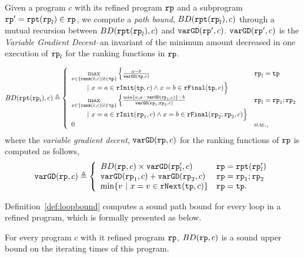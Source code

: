 \begin{defn}
\label{def:loopbound}
Given a program $c$ with its refined program $\mathtt{rp}$ and a subprogram $\mathtt{rp}' = \mathtt{rpt}(\mathtt{rp}_l) \in \mathtt{rp}$, we compute a \emph{path bound}, $BD(\mathtt{rpt}(\mathtt{rp}_l), c)$
through a mutual recursion between  $BD(\mathtt{rpt}(\mathtt{rp}_l), c)$ and $\mathtt{varGD}(\mathtt{rp}', c)$.
$\mathtt{varGD}(\mathtt{rp}', c)$ is the \emph{Variable Gradient Decent}--an invariant of the minimum amount decreased in one execution of $\mathtt{rp}_l$ for the ranking functions in $\mathtt{rp}$.

 \[
  BD(\rprepeat(\rprog_l), c)\triangleq
 \left\{ 
 \begin{array}{ll}
 \max\limits_{x \in \left\{ \rank(\absevent, c) | \absevent \in \tpath \right\}} 
 \Big\{ {\frac{a - b}{\varGD(\tpath, c)}} & \rprog_l = \tpath
 \\ \qquad 
 ~\vert~
 x = a \in \rfinit(\tpath, c)
 \land x = b \in \rffinal(\tpath, c)
 \Big\} 
 \\
 \max\limits_{x \in \left\{ \rank(\absevent, c) | \absevent \in \tpath \right\}} 
 \Big\{ {\frac{\min\{ a, a - \varGD(\rprog_1, c) \} - b}{\varGD(\rprog_1;\rprog_2, c)}} 
 & \rprog_l = \rprog_1;\rprog_2
 \\ \qquad 
 ~\vert~
 x = a \in \rfinit(\rprog_1, c)
 \land x = b \in \rffinal(\rprog_2;\rprog_2, c)
 \Big\} \\
 0 & o.w.,
 \end{array} 
 \right.
\]
where the \emph{variable gradient decent},
$\mathtt{varGD}(\mathtt{rp}, c)$ for the ranking functions of $\mathtt{rp}$ is computed as follows,
\[
  \varGD(\rprog, c) \triangleq
 \left\{
 \begin{array}{ll}
 BD(\rprog, c) \times {\varGD(\rprog_l', c)} & \rprog = \rprepeat(\rprog_l') \\
 \varGD(\rprog_1, c) + \varGD(\rprog_2, c) & \rprog = \rprog_1;\rprog_2 \\
 \min\left\{v ~|~ x = v \in \rfnext(\tpath, c) \right\} & \rprog = \tpath.
 \end{array}
 \right.
 \]
\end{defn}
 Definition~\ref{def:loopbound} computes a sound path bound for every loop in a refined program, which is formally presented as below.
\begin{lem}
  \label{lem:loopbound_sound}
  For every program $c$ with it refined program $\mathtt{rp}$,
  $BD(\mathtt{rp}, c)$ is a sound upper bound on the iterating times of this program.
\end{lem}

